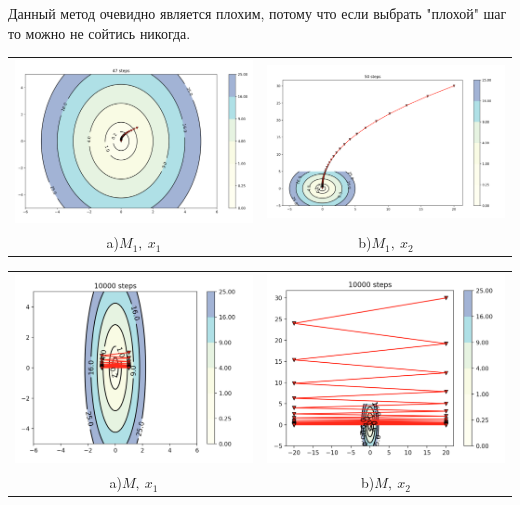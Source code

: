 \documentclass{article}
\theoremstyle{definition}
\theoremstyle{remark}
\begin{document}
Данный метод очевидно является плохим, потому что если выбрать "плохой" шаг то можно не сойтись никогда.
\begin{center}
\begin{tabular}{cc}
\includegraphics[width=0.49\linewidth]{15.png} &
\includegraphics[width=0.49\linewidth]{16.png} \\
 a)$M_1,\ x_1$ & b)$M_1,\ x_2$\\
\end{tabular}
\end{center}
\begin{center}
\begin{tabular}{cc}
\includegraphics[width=0.49\linewidth]{17.png} &
\includegraphics[width=0.49\linewidth]{18.png} \\
 a)$M,\ x_1$ & b)$M,\ x_2$\\
\end{tabular}
\end{center}
\end{document}
